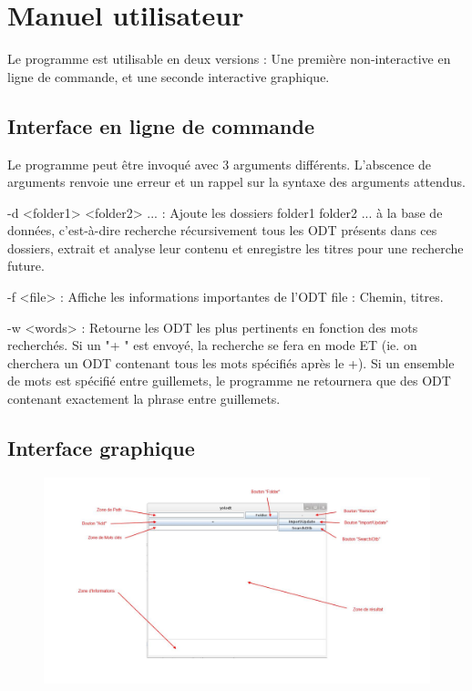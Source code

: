 \section{Manuel utilisateur}
Le programme est utilisable en deux versions : Une première non-interactive en ligne de commande, et une seconde interactive graphique.
\subsection{Interface en ligne de commande}

Le programme peut être invoqué avec 3 arguments différents. L'abscence de arguments renvoie une erreur et un rappel sur la syntaxe des arguments attendus.

-d <folder1> <folder2> ... : Ajoute les dossiers folder1 folder2 ... à la base de données, c'est-à-dire recherche récursivement tous les ODT présents dans ces dossiers, extrait et analyse leur contenu et enregistre les titres pour une recherche future.

-f <file> : Affiche les informations importantes de l'ODT file : Chemin, titres.

-w <words> : Retourne les ODT les plus pertinents en fonction des mots recherchés. Si un "+ " est envoyé, la recherche se fera en mode ET (ie. on cherchera un ODT contenant tous les mots spécifiés après le +). Si un ensemble de mots est spécifié entre guillemets, le programme ne retournera que des ODT contenant exactement la phrase entre guillemets.

\newpage
\subsection{Interface graphique}
 \begin{figure}[!ht]
	\center
	\includegraphics[width=\textwidth]{./images/gui.jpg}
\end{figure}

